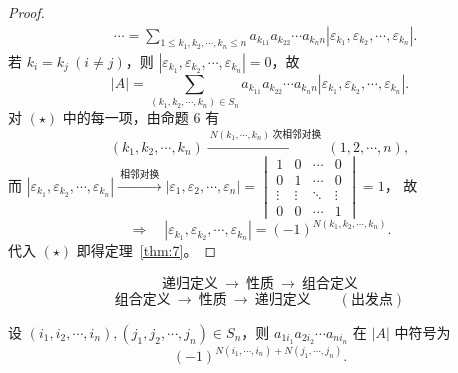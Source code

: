 \begin{proof}
\begin{align*}
&\cdots=\sum_{1\le k_1,k_2,\cdots,k_n\le n}
a_{k_11}a_{k_22}\cdots a_{k_nn}
\left|\varepsilon_{k_1},\varepsilon_{k_2},\cdots,\varepsilon_{k_n}\right|.
\end{align*}
若 $k_i=k_j\ (i\ne j)$，则
$\left|\varepsilon_{k_1},\varepsilon_{k_2},\cdots,\varepsilon_{k_n}\right|=0$，故
\begin{equation}
|A|=\sum_{(k_1,k_2,\cdots,k_n)\in S_n}
a_{k_11}a_{k_22}\cdots a_{k_nn}
\left|\varepsilon_{k_1},\varepsilon_{k_2},\cdots,\varepsilon_{k_n}\right|.
\tag{$\star$}
\end{equation}
对 $(\star)$ 中的每一项，由命题 6 有
\[
(k_1,k_2,\cdots,k_n)
\xrightarrow{\ N(k_1,\cdots,k_n)\ \text{次相邻对换}\ }
(1,2,\cdots,n),
\]
而\;
$\left|\varepsilon_{k_1},\varepsilon_{k_2},\cdots,\varepsilon_{k_n}\right|
\xrightarrow{\ \text{相邻对换}\ }
\left|\varepsilon_1,\varepsilon_2,\cdots,\varepsilon_n\right|
=\begin{vmatrix}
1&0&\cdots&0\\
0&1&\cdots&0\\
\vdots&\vdots&\ddots&\vdots\\
0&0&\cdots&1
\end{vmatrix}=1$，
故
\[
\Longrightarrow\quad
\left|\varepsilon_{k_1},\varepsilon_{k_2},\cdots,\varepsilon_{k_n}\right|
=(-1)^{N(k_1,k_2,\cdots,k_n)}.
\]
代入 $(\star)$ 即得定理~\ref{thm:7}。
\end{proof}

\[
\textbf{递归定义}\ \longrightarrow\ \textbf{性质}\ \longrightarrow\ \textbf{组合定义}
\]
\[
\textbf{组合定义}\ \longrightarrow\ \textbf{性质}\ \longrightarrow\ \textbf{递归定义}
\qquad(\text{出发点})
\]

\begin{lemma}\label{lem:8}
设 $(i_1,i_2,\cdots,i_n),(j_1,j_2,\cdots,j_n)\in S_n$，则
$a_{1i_1}a_{2i_2}\cdots a_{ni_n}$ 在 $|A|$ 中符号为
\[
(-1)^{N(i_1,\cdots,i_n)+N(j_1,\cdots,j_n)}.
\]
\end{lemma}

